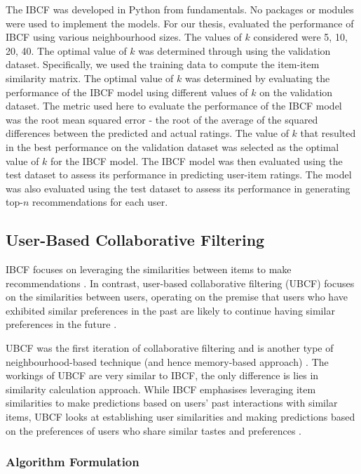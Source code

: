 The IBCF was developed in Python from fundamentals. No packages or modules were used to implement the models. For our thesis, evaluated the performance of IBCF using various neighbourhood sizes. The values of $k$ considered were 5, 10, 20, 40. The optimal value of $k$ was determined through using the validation dataset. Specifically, we used the training data to compute the item-item similarity matrix. The optimal value of $k$ was determined by evaluating the performance of the IBCF model using different values of $k$ on the validation dataset. The metric used here to evaluate the performance of the IBCF model was the root mean squared error - the root of the average of the squared differences between the predicted and actual ratings. The value of $k$ that resulted in the best performance on the validation dataset was selected as the optimal value of $k$ for the IBCF model. The IBCF model was then evaluated using the test dataset to assess its performance in predicting user-item ratings. The model was also evaluated using the test dataset to assess its performance in generating top-$n$ recommendations for each user. 




\subsection{User-Based Collaborative Filtering}
\label{subsec:4 User-Based Collaborative Filtering}

IBCF focuses on leveraging the similarities between items to make recommendations \cite{linden2001collaborative}. In contrast, user-based collaborative filtering (UBCF) focuses on the similarities between users, operating on the premise that users who have exhibited similar preferences in the past are likely to continue having similar preferences in the future \cite{jia2015user}.

UBCF was the first iteration of collaborative filtering and is another type of neighbourhood-based technique (and hence memory-based approach) \cite{sarwar2001item}. The workings of UBCF are very similar to IBCF, the only difference is lies in similarity calculation approach. While IBCF emphasises leveraging item similarities to make predictions based on users' past interactions with similar items, UBCF looks at establishing user similarities and making predictions based on the preferences of users who share similar tastes and preferences \cite{jia2015user}.


\subsubsection{Algorithm Formulation}
\label{subsubsec:4 Algorithm Formulation UB}

